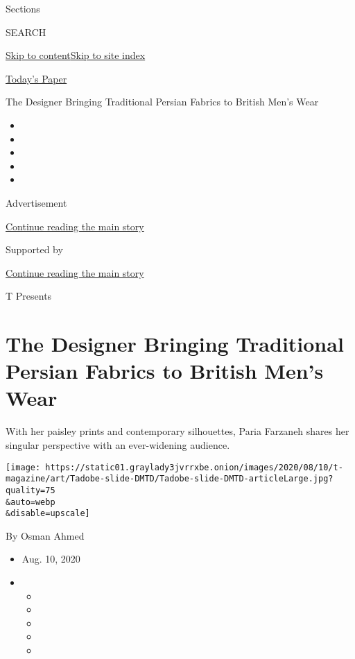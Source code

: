 Sections

SEARCH

\protect\hyperlink{site-content}{Skip to
content}\protect\hyperlink{site-index}{Skip to site index}

\href{https://myaccount.nytimes3xbfgragh.onion/auth/login?response_type=cookie\&client_id=vi}{}

\href{https://www.nytimes3xbfgragh.onion/section/todayspaper}{Today's
Paper}

The Designer Bringing Traditional Persian Fabrics to British Men's Wear

\begin{itemize}
\item
\item
\item
\item
\item
\end{itemize}

Advertisement

\protect\hyperlink{after-top}{Continue reading the main story}

Supported by

\protect\hyperlink{after-sponsor}{Continue reading the main story}

T Presents

\hypertarget{the-designer-bringing-traditional-persian-fabrics-to-british-mens-wear}{%
\section{The Designer Bringing Traditional Persian Fabrics to British
Men's
Wear}\label{the-designer-bringing-traditional-persian-fabrics-to-british-mens-wear}}

With her paisley prints and contemporary silhouettes, Paria Farzaneh
shares her singular perspective with an ever-widening audience.

\texttt{[image: https://static01.graylady3jvrrxbe.onion/images/2020/08/10/t-magazine/art/Tadobe-slide-DMTD/Tadobe-slide-DMTD-articleLarge.jpg?quality=75\\\&auto=webp\\\&disable=upscale]}

By Osman Ahmed

\begin{itemize}
\item
  Aug. 10, 2020
\item
  \begin{itemize}
  \item
  \item
  \item
  \item
  \item
  \end{itemize}
\end{itemize}

